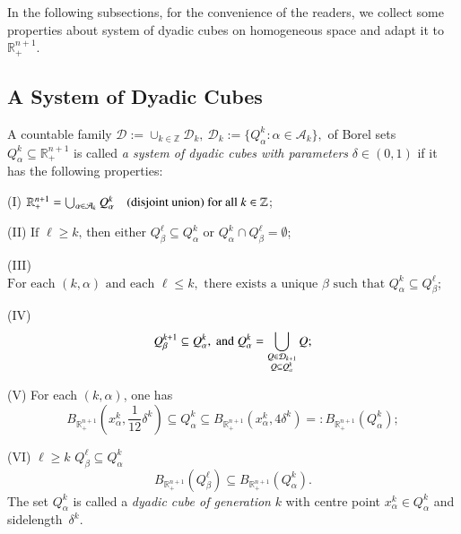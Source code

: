 \documentclass[12pt]{amsart}
\begin{document}
In the following subsections, for the convenience of the readers, we collect some properties about system of dyadic cubes on homogeneous space and adapt it to $\mathbb{R}_+^{n+1}$.
\subsection{A System of Dyadic Cubes}\label{sec:dyadic_cubes}
A
countable family
$
    \mathcal{D}
    := \cup_{k\in\mathbb{Z}}\mathcal{D}_{k}, \
    \mathcal{D}_{k}
    :=\{Q^k_{\alpha}\colon \alpha\in \mathcal{A}_k\},
$
of Borel sets $Q^k_{\alpha}\subseteq \mathbb{R}_+^{n+1}$ is called \textit{a
system of dyadic cubes with parameters} $\delta\in (0,1)$  if it has the following properties:

\smallskip
(I) $    \mathbb{R}_+^{n+1}
    = \bigcup_{\alpha\in \mathcal{A}_k} Q^k_{\alpha}
    \quad\text{(disjoint union) for all}~k\in\mathbb{Z}$;


\smallskip
(II) $%
    \text{If }\ell\geq k\text{, then either }
        Q^{\ell}_{\beta}\subseteq Q^k_{\alpha}\text{ or }
        Q^k_{\alpha}\cap Q^{\ell}_{\beta}=\emptyset$;


\smallskip
(III) $\text{For each }(k,\alpha)\text{ and each } \ell\leq k,
    \text{ there exists a unique } \beta
    \text{ such that }Q^{k}_{\alpha}\subseteq Q^\ell_{\beta}$;


\smallskip
(IV)
     $$ Q^{k+1}_{\beta}\subseteq Q^k_{\alpha},\ {\rm and}\
        Q^k_{\alpha} =\bigcup_{{\substack{Q\in\mathcal{D}_{k+1}\\ Q\subseteq Q^k_{\alpha}}}}Q;$$

\smallskip
(V) For each $(k,\alpha)$, one has
\begin{equation}\label{eq:contain}
B_{\mathbb{R}_{+}^{n+1}}(x^k_{\alpha},\frac{1}{12}\delta^k)
    \subseteq Q^k_{\alpha}\subseteq B_{\mathbb{R}_{+}^{n+1}}(x^k_{\alpha},4\delta^k)
    =: B_{\mathbb{R}_{+}^{n+1}}(Q^k_{\alpha});
\end{equation}

\smallskip
(VI) $\ell\geq k$
   $Q^{\ell}_{\beta}\subseteq Q^k_{\alpha}$
$$B_{\mathbb{R}_{+}^{n+1}}(Q^{\ell}_{\beta})\subseteq B_{\mathbb{R}_{+}^{n+1}}(Q^k_{\alpha}).$$
The set $Q^k_{\alpha}$ is called a \textit{dyadic cube of
generation} $k$ with centre point $x^k_{\alpha}\in Q^k_{\alpha}$
and sidelength~$\delta^k$.
\end{document}
